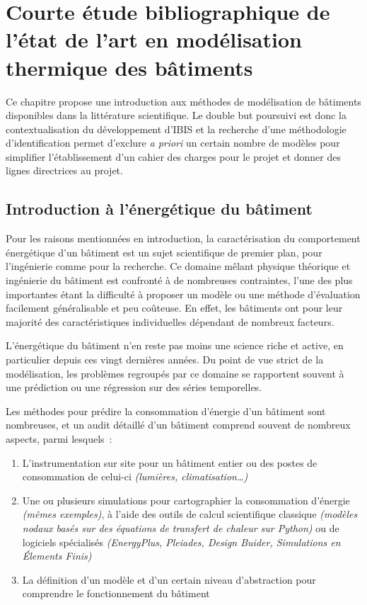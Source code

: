 \chapter{Courte étude bibliographique de l'état de l'art en modélisation thermique des bâtiments}\label{ch:etat-de-l'art-en-modelisation-de-batiments-:-courte-etude-bibliographique}

    Ce chapitre propose une introduction aux méthodes de modélisation de bâtiments disponibles dans la littérature scientifique.
    Le double but poursuivi est donc la contextualisation du développement d'IBIS et la recherche d'une méthodologie d'identification permet d'exclure \textit{a priori} un certain nombre de modèles pour simplifier l'établissement d'un cahier des charges pour le projet et donner des lignes directrices au projet.

\section{Introduction à l'énergétique du bâtiment}\label{sec:introduction-a-l'energetique-du-batiment}

    Pour les raisons mentionnées en introduction, la caractérisation du comportement énergétique d'un bâtiment est un sujet scientifique de premier plan, pour l'ingénierie comme pour la recherche.
    Ce domaine mêlant physique théorique et ingénierie du bâtiment est confronté à de nombreuses contraintes, l'une des plus importantes étant la difficulté à proposer un modèle ou une méthode d'évaluation facilement généralisable et peu coûteuse.
    En effet, les bâtiments ont pour leur majorité des caractéristiques individuelles dépendant de nombreux facteurs.

    L'énergétique du bâtiment n'en reste pas moins une science riche et active, en particulier depuis ces vingt dernières années.
    Du point de vue strict de la modélisation, les problèmes regroupés par ce domaine se
    rapportent souvent à une prédiction ou une régression sur des séries temporelles\cite{LU2022111718}.
    
    Les méthodes pour prédire la consommation d'énergie d'un bâtiment sont nombreuses, et un audit détaillé d'un bâtiment comprend souvent de nombreux aspects, parmi lesquels~\cite{audit_energy_engineering}:
    \begin{enumerate}
        \item L'instrumentation sur site pour un bâtiment entier ou des postes de consommation de celui-ci \textit{(lumières, climatisation…)}
        \item Une ou plusieurs simulations pour cartographier la consommation d'énergie
        \textit{(mêmes exemples)}, à l'aide des outils de calcul scientifique classique
        \textit{(modèles nodaux basés sur des équations de transfert de chaleur sur Python)} ou de logiciels spécialisés \it{(EnergyPlus, Pleiades, Design Buider, Simulations en Élements Finis)}
        \item La définition d'un modèle et d'un certain niveau d'abstraction pour comprendre le fonctionnement du bâtiment
    \end{enumerate}

